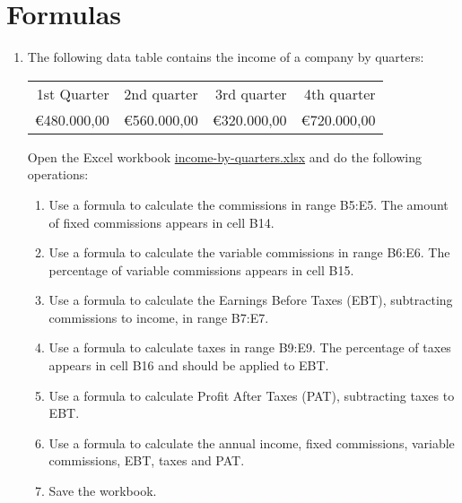 
\section{Formulas}
\begin{enumerate}[leftmargin=*,resume]
\item \label{ex-income-quarters}The following data table contains the income of a company by quarters:
\begin{center} 
\begin{tabular}{rrrr}
\toprule 
1st Quarter & 2nd quarter & 3rd quarter & 4th quarter\\

€480.000,00 &  €560.000,00 & €320.000,00 & €720.000,00\\
\bottomrule
\end{tabular}
\end{center}

Open the Excel workbook
\href{http://aprendeconalf.es/office/excel/exercises/formulas/income-by-quarters.xlsx}{\textsf{income-by-quarters.xlsx}}
and do the following operations:

\begin{enumerate}
\item Use a formula to calculate the commissions in range B5:E5. The amount of fixed commissions appears in
cell B14.
\item Use a formula to calculate the variable commissions in range B6:E6. The percentage of variable commissions appears
in cell B15.
\item Use a formula to calculate the Earnings Before Taxes (EBT), subtracting commissions to income, in range B7:E7.
\item Use a formula to calculate taxes in range B9:E9. The percentage of taxes appears in cell B16 and should be applied
to EBT.
\item Use a formula to calculate Profit After Taxes (PAT), subtracting taxes to EBT.
\item Use a formula to calculate the annual income, fixed commissions, variable commissions, EBT, taxes and PAT. 
\item Save the workbook. 
\end{enumerate}


\end{enumerate}
